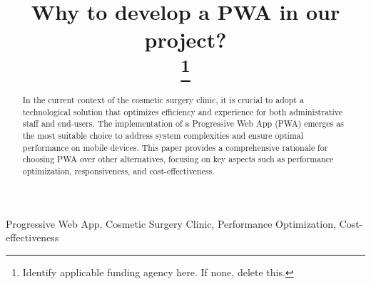 \documentclass[conference]{IEEEtran}
\begin{document}
\title{Why to develop a PWA in our project?\\
\thanks{Identify applicable funding agency here. If none, delete this.}
}

\author{
\and
{}
}



\maketitle

\begin{abstract}
In the current context of the cosmetic surgery clinic, it is crucial to adopt a technological solution that optimizes efficiency and experience for both administrative staff and end-users. The implementation of a Progressive Web App (PWA) emerges as the most suitable choice to address system complexities and ensure optimal performance on mobile devices. This paper provides a comprehensive rationale for choosing PWA over other alternatives, focusing on key aspects such as performance optimization, responsiveness, and cost-effectiveness.
\end{abstract}

\begin{IEEEkeywords}
Progressive Web App, Cosmetic Surgery Clinic, Performance Optimization, Cost-effectiveness
\end{IEEEkeywords}
\end{document}
